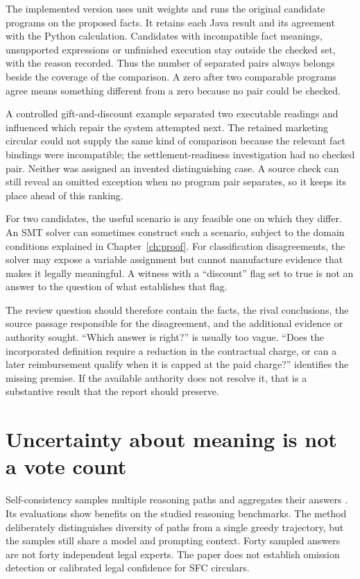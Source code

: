\documentclass[12pt,a4paper,oneside,openany]{book}
\begin{document}
The implemented version uses unit weights and runs the original candidate
programs on the proposed facts. It retains each Java result and its agreement
with the Python calculation. Candidates with incompatible fact meanings,
unsupported expressions or unfinished execution stay outside the checked set,
with the reason recorded. Thus the number of separated pairs always belongs
beside the coverage of the comparison. A zero after two comparable programs
agree means something different from a zero because no pair could be checked.

A controlled gift-and-discount example separated two executable readings and
influenced which repair the system attempted next. The retained marketing
circular could not supply the same kind of comparison because the relevant
fact bindings were incompatible; the settlement-readiness investigation had
no checked pair. Neither was assigned an invented distinguishing case. A source
check can still reveal an omitted exception when no program pair separates,
so it keeps its place ahead of this ranking.

For two candidates, the useful scenario is any feasible one on which they differ.
An SMT solver can sometimes construct such a scenario, subject to the domain
conditions explained in Chapter~\ref{ch:proof}. For classification disagreements,
the solver may expose a variable assignment but cannot manufacture evidence that
makes it legally meaningful. A witness with a ``discount'' flag set to true is not
an answer to the question of what establishes that flag.

The review question should therefore contain the facts, the rival conclusions,
the source passage responsible for the disagreement, and the additional evidence
or authority sought. ``Which answer is right?'' is usually too vague. ``Does the
incorporated definition require a reduction in the contractual charge, or can a
later reimbursement qualify when it is capped at the paid charge?'' identifies
the missing premise. If the available authority does not resolve it, that is a
substantive result that the report should preserve.

\section{Uncertainty about meaning is not a vote count}
\label{merge:M05:09}


Self-consistency samples multiple reasoning paths and aggregates their answers
\citep[section 2]{selfconsistency2023}. Its evaluations show benefits on the
studied reasoning benchmarks. The method deliberately distinguishes diversity of
paths from a single greedy trajectory, but the samples still share a model and
prompting context. Forty sampled answers are not forty independent legal experts.
The paper does not establish omission detection or calibrated legal confidence
for SFC circulars.
\end{document}
